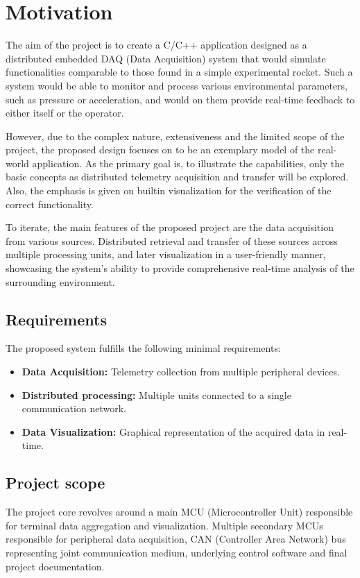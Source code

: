 \chapter{Motivation}\label{ch:motivation}

The aim of the project is to create a C/C++ application designed as a distributed embedded DAQ (Data Acquisition)
system that would simulate functionalities comparable to those found in a simple experimental rocket.
Such a system would be able to monitor and process various environmental parameters, such as pressure or
acceleration, and would on them provide real-time feedback to either itself or the operator.

However, due to the complex nature, extensiveness and the limited scope of the project, the proposed design focuses on
to be an exemplary model of the real-world application.
As the primary goal is, to illustrate the capabilities, only the basic concepts as distributed
telemetry acquisition and transfer will be explored.
Also, the emphasis is given on builtin visualization for the verification of the correct functionality.

To iterate, the main features of the proposed project are the data acquisition from various sources.
Distributed retrieval and transfer of these sources across multiple processing units, and later visualization in a
user-friendly manner, showcasing the system's ability to provide comprehensive real-time analysis of the surrounding
environment.

\section{Requirements}\label{sec:system-requirements}
The proposed system fulfills the following minimal requirements:
\begin{itemize}[leftmargin=*] %
    \item \textbf{Data Acquisition:} Telemetry collection from multiple peripheral devices.
    \item \textbf{Distributed processing:} Multiple units connected to a single communication network.
    \item \textbf{Data Visualization:} Graphical representation of the acquired data in real-time.
\end{itemize}

\newpage

\section{Project scope}\label{sec:scope}
The project core revolves around a main MCU (Microcontroller Unit) responsible for terminal data aggregation and
visualization.
Multiple secondary MCUs responsible for peripheral data acquisition, CAN (Controller Area Network) bus representing
joint communication medium, underlying control software and final project documentation.

